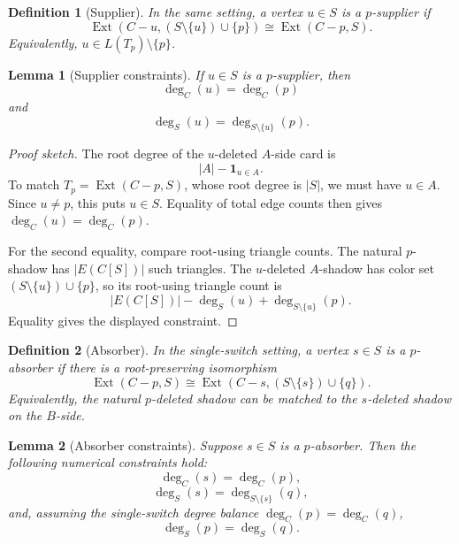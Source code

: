 \documentclass[11pt]{article}
\newtheorem{lemma}{Lemma}
\newtheorem{definition}{Definition}
\newcommand{\Ext}{\operatorname{Ext}}
\newcommand{\one}{\mathbf{1}}
\begin{document}
\begin{definition}[Supplier]
In the same setting, a vertex \(u\in S\) is a \(p\)-supplier if
\[
  \Ext(C-u,(S\setminus\{u\})\cup\{p\})
  \cong
  \Ext(C-p,S).
\]
Equivalently, \(u\in L(T_p)\setminus\{p\}\).
\end{definition}

\begin{lemma}[Supplier constraints]
If \(u\in S\) is a \(p\)-supplier, then
\[
  \deg_C(u)=\deg_C(p)
\]
and
\[
  \deg_S(u)=\deg_{S\setminus\{u\}}(p).
\]
\end{lemma}

\begin{proof}[Proof sketch]
The root degree of the \(u\)-deleted \(A\)-side card is
\[
  |A|-\one_{u\in A}.
\]
To match \(T_p=\Ext(C-p,S)\), whose root degree is \(|S|\), we must have
\(u\in A\).  Since \(u\neq p\), this puts \(u\in S\).  Equality of total edge
counts then gives \(\deg_C(u)=\deg_C(p)\).

For the second equality, compare root-using triangle counts.  The natural
\(p\)-shadow has \(|E(C[S])|\) such triangles.  The \(u\)-deleted
\(A\)-shadow has color set \((S\setminus\{u\})\cup\{p\}\), so its root-using
triangle count is
\[
  |E(C[S])|-\deg_S(u)+\deg_{S\setminus\{u\}}(p).
\]
Equality gives the displayed constraint.
\end{proof}

\begin{definition}[Absorber]
In the single-switch setting, a vertex \(s\in S\) is a \(p\)-absorber if
there is a root-preserving isomorphism
\[
  \Ext(C-p,S)
  \cong
  \Ext(C-s,(S\setminus\{s\})\cup\{q\}).
\]
Equivalently, the natural \(p\)-deleted shadow can be matched to the
\(s\)-deleted shadow on the \(B\)-side.
\end{definition}

\begin{lemma}[Absorber constraints]
Suppose \(s\in S\) is a \(p\)-absorber.  Then the following numerical
constraints hold:
\[
  \deg_C(s)=\deg_C(p),
\]
\[
  \deg_S(s)=\deg_{S\setminus\{s\}}(q),
\]
and, assuming the single-switch degree balance
\(\deg_C(p)=\deg_C(q)\),
\[
  \deg_S(p)=\deg_S(q).
\]
\end{lemma}
\end{document}
